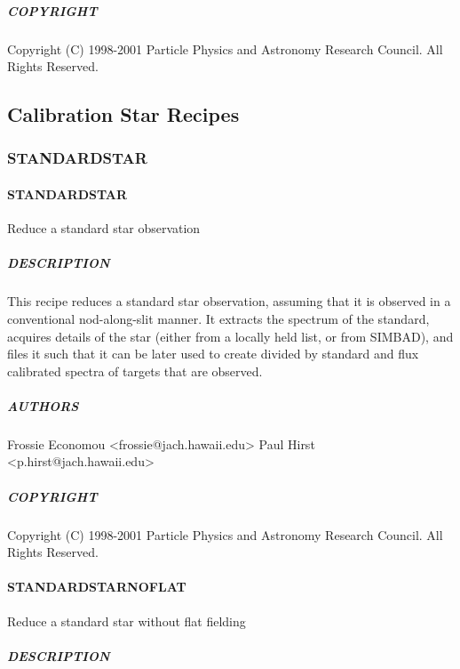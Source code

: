 \documentclass[twoside,11pt]{article}
\renewcommand{\_}{\texttt{\symbol{95}}}
\begin{document}
\subparagraph*{COPYRIGHT\label{_REDUCE_BIAS__COPYRIGHT}}

Copyright (C) 1998-2001 Particle Physics and Astronomy Research
Council. All Rights Reserved.



\subsection{Calibration Star Recipes}

\subsubsection{STANDARD\_STAR}
\paragraph*{STANDARD\_STAR\label{STANDARD_STAR}}

Reduce a standard star observation

\subparagraph*{DESCRIPTION\label{STANDARD_STAR_DESCRIPTION}}

This recipe reduces a standard star observation, assuming that it is
observed in a conventional nod-along-slit manner. It extracts the
spectrum of the standard, acquires details of the star (either from a
locally held list, or from SIMBAD), and files it such that it can be
later used to create divided by standard and flux calibrated spectra
of targets that are observed.

\subparagraph*{AUTHORS\label{STANDARD_STAR_AUTHORS}}

Frossie Economou <frossie@jach.hawaii.edu>
Paul Hirst <p.hirst@jach.hawaii.edu>

\subparagraph*{COPYRIGHT\label{STANDARD_STAR_COPYRIGHT}}

Copyright (C) 1998-2001 Particle Physics and Astronomy Research
Council. All Rights Reserved.

\paragraph*{STANDARD\_STAR\_NOFLAT\label{STANDARD_STAR_NOFLAT}}

Reduce a standard star without flat fielding

\subparagraph*{DESCRIPTION\label{STANDARD_STAR_NOFLAT_DESCRIPTION}}
\end{document}
